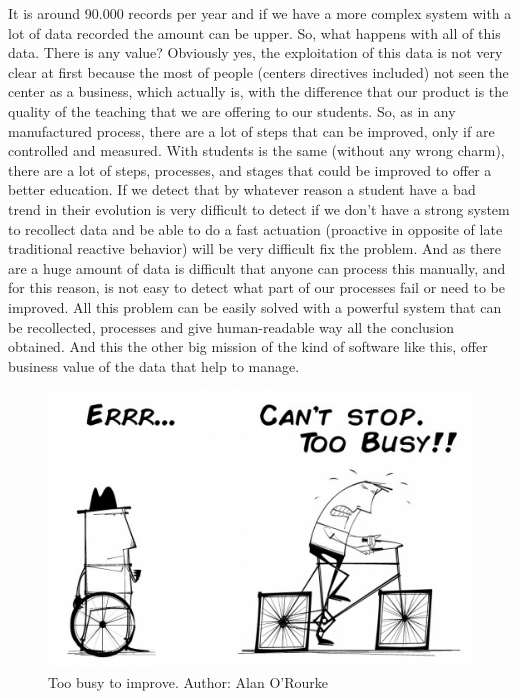 It is around 90.000 records per year
and if we have a more complex system with a lot of data recorded the amount can be upper.
So, what happens with all of this data. There is any value? Obviously yes,
the exploitation of this data is not very clear at first because the most of
people (centers directives included) not seen the center as a business, which
actually is, with the difference that our product is the quality of the teaching that we are
offering to our students.
\intro
So, as in any manufactured process, there are a lot of steps that can be improved,
only if are controlled and measured. With students is the same (without any wrong
charm), there are a lot of steps, processes, and stages that could be improved to
offer a better education.
If we detect that by whatever reason a student have a bad trend in their evolution
is very difficult to detect if we don't have a strong system to recollect data
and be able to do a fast actuation (proactive in opposite of late traditional
reactive behavior) will be very difficult fix the problem.
\intro
And as there are a huge amount of data is difficult that anyone can process this
manually, and for this reason, is not easy to detect what part of our processes
fail or need to be improved.
All this problem can be easily solved with a powerful system that can be recollected,
processes and give human-readable way all the conclusion obtained.
\intro
And this the other big mission of the kind of software like this, offer
business value of the data that help to manage.

\begin{figure}[H]
  \includegraphics[scale=0.5]{img/toobusytoimprove.jpeg}
  \centering
  \caption{Too busy to improve. Author: Alan O'Rourke}
\end{figure}
